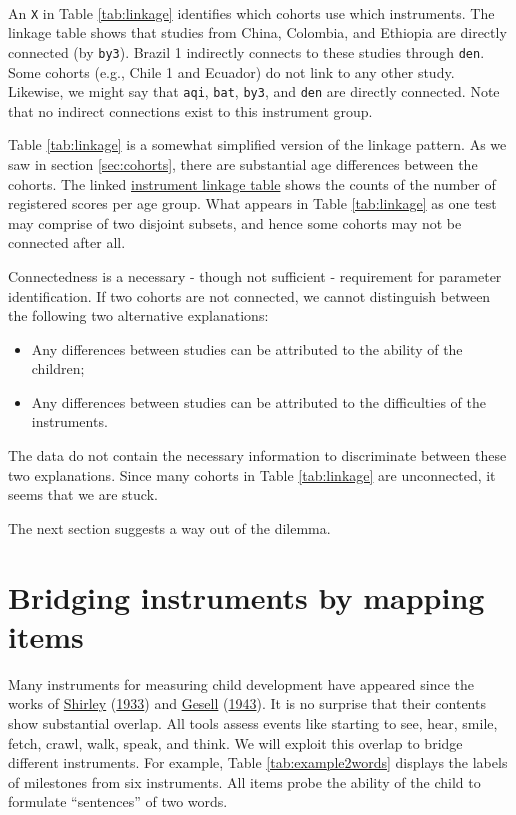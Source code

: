 \documentclass[
]{book}
\providecommand{\tightlist}{%
  \setlength{\itemsep}{0pt}\setlength{\parskip}{0pt}}
\begin{document}
~

An \texttt{X} in Table \ref{tab:linkage} identifies which cohorts use which instruments. The linkage table shows that studies from China, Colombia, and Ethiopia are directly connected (by \texttt{by3}). Brazil 1 indirectly connects to these studies through \texttt{den}. Some cohorts (e.g., Chile 1 and Ecuador) do not link to any other study. Likewise, we might say that \texttt{aqi}, \texttt{bat}, \texttt{by3}, and \texttt{den} are directly connected. Note that no indirect connections exist to this instrument group.

Table \ref{tab:linkage} is a somewhat simplified version of the linkage pattern. As we saw in section \ref{sec:cohorts}, there are substantial age differences between the cohorts. The linked \href{https://tnochildhealthstatistics.shinyapps.io/GCDG_instrument_linkage/}{instrument linkage table} shows the counts of the number of registered scores per age group. What appears in Table \ref{tab:linkage} as one test may comprise of two disjoint subsets, and hence some cohorts may not be connected after all.

Connectedness is a necessary - though not sufficient - requirement for parameter identification. If two cohorts are not connected, we cannot distinguish between the following two alternative explanations:

\begin{itemize}
\tightlist
\item
  Any differences between studies can be attributed to the ability of the children;
\item
  Any differences between studies can be attributed to the difficulties of the instruments.
\end{itemize}

The data do not contain the necessary information to discriminate between these two explanations. Since many cohorts in Table \ref{tab:linkage} are unconnected, it seems that we are stuck.

The next section suggests a way out of the dilemma.

\hypertarget{sec:mapping}{%
\section{Bridging instruments by mapping items}\label{sec:mapping}}

Many instruments for measuring child development have appeared since the works of \protect\hyperlink{ref-shirley1933}{Shirley} (\protect\hyperlink{ref-shirley1933}{1933}) and \protect\hyperlink{ref-gesell1943}{Gesell} (\protect\hyperlink{ref-gesell1943}{1943}). It is no surprise that their contents show substantial overlap. All tools assess events like starting to see, hear, smile, fetch, crawl, walk, speak, and think. We will exploit this overlap to bridge different instruments. For example, Table \ref{tab:example2words} displays the labels of milestones from six instruments. All items probe the ability of the child to formulate ``sentences'' of two words.
\end{document}
